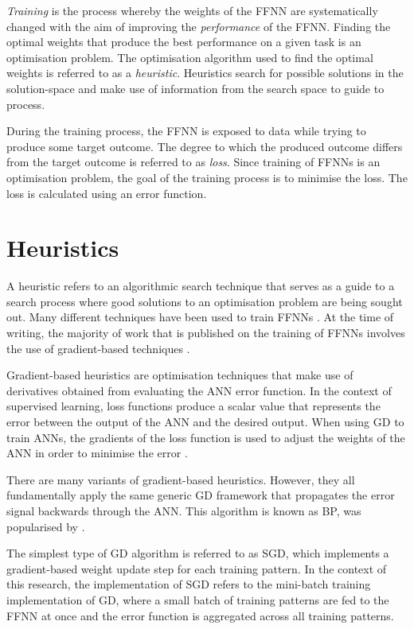 \documentclass[preprint,review,12pt]{elsarticle}
\begin{document}
\textit{Training} is the process whereby the weights of the \acs{FFNN} are systematically changed with the aim of improving the \textit{performance} of the \acs{FFNN}. Finding the optimal weights that produce the best performance on a given task is an optimisation problem. The optimisation algorithm used to find the optimal weights is referred to as a \textit{heuristic}. Heuristics search for possible solutions in the solution-space and make use of information from the search space to guide to process.

During the training process, the \acs{FFNN} is exposed to data while trying to produce some target outcome. The degree to which the produced outcome differs from the target outcome is referred to as \textit{loss}. Since training of \acp{FFNN} is an optimisation problem, the goal of the training process is to minimise the loss. The loss is calculated using an error function.

\section{Heuristics}
\label{sec:heuristics}

A heuristic refers to an algorithmic search technique that serves as a guide to a search process where good solutions to an optimisation problem are being sought out. Many different techniques have been used to train \acp{FFNN} \citep{ref:kingma:2014}. At the time of writing, the majority of work that is published on the training of \acp{FFNN} involves the use of gradient-based techniques \citep{ref:nel:2021}.

Gradient-based heuristics are optimisation techniques that make use of derivatives obtained from evaluating the \acs{ANN} error function. In the context of supervised learning, loss functions produce a scalar value that represents the error between the output of the \acs{ANN} and the desired output. When using \acf{GD} to train \acp{ANN}, the gradients of the loss function is used to adjust the weights of the \acs{ANN} in order to minimise the error \citep{ref:engelbrecht:2007}.

There are many variants of gradient-based heuristics. However, they all fundamentally apply the same generic \acs{GD} framework that propagates the error signal backwards through the \acs{ANN}. This algorithm is known as \acf{BP}, was popularised by \citet{ref:werbos:1994}.

The simplest type of \acs{GD} algorithm is referred to as \acf{SGD}, which implements a gradient-based weight update step for each training pattern. In the context of this research, the implementation of \acs{SGD} refers to the mini-batch training implementation of \acs{GD}, where a small batch of training patterns are fed to the \acs{FFNN} at once and the error function is aggregated across all training patterns.
\end{document}
